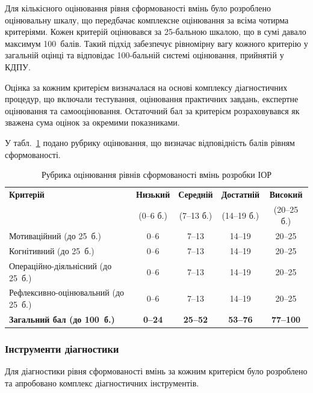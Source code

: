 Для кількісного оцінювання рівня сформованості вмінь було розроблено оцінювальну шкалу, що передбачає комплексне оцінювання за всіма чотирма критеріями. Кожен критерій оцінювався за 25-бальною шкалою, що в сумі давало максимум 100~балів. Такий підхід забезпечує рівномірну вагу кожного критерію у загальній оцінці та відповідає 100-бальній системі оцінювання, прийнятій у КДПУ.

Оцінка за кожним критерієм визначалася на основі комплексу діагностичних процедур, що включали тестування, оцінювання практичних завдань, експертне оцінювання та самооцінювання. Остаточний бал за критерієм розраховувався як зважена сума оцінок за окремими показниками.

У табл.~\ref{tab:assessment_rubric} подано рубрику оцінювання, що визначає відповідність балів рівням сформованості.

\begin{table}[!h]
\centering
\caption{Рубрика оцінювання рівнів сформованості вмінь розробки ІОР}
\label{tab:assessment_rubric}
\small
\begin{tabular}{|l|c|c|c|c|}
\hline
\hfill \textbf{Критерій} & \textbf{Низький} & \textbf{Середній} & \textbf{Достатній} & \textbf{Високий} \\
 & (0--6 б.) & (7--13 б.) & (14--19 б.) & (20--25 б.) \\
\hline
Мотиваційний (до 25~б.) & 0--6 & 7--13 & 14--19 & 20--25 \\
\hline
Когнітивний (до 25~б.) & 0--6 & 7--13 & 14--19 & 20--25 \\
\hline
Операційно-діяльнісний (до 25~б.) & 0--6 & 7--13 & 14--19 & 20--25 \\
\hline
Рефлексивно-оцінювальний (до 25~б.) & 0--6 & 7--13 & 14--19 & 20--25 \\
\hline
\textbf{Загальний бал (до 100~б.)} & \textbf{0--24} & \textbf{25--52} & \textbf{53--76} & \textbf{77--100} \\
\hline
\end{tabular}
\end{table}

\subsubsection{Інструменти діагностики}

Для діагностики рівня сформованості вмінь за кожним критерієм було розроблено та апробовано комплекс діагностичних інструментів.

